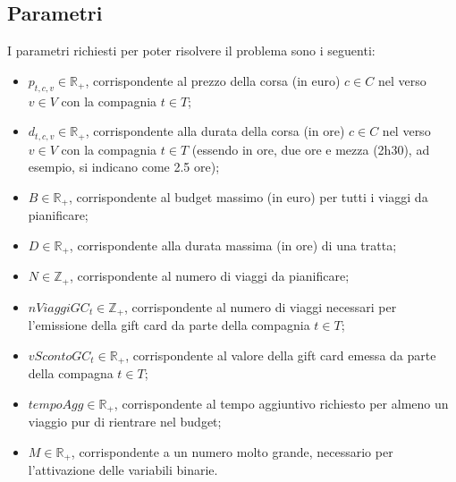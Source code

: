 \documentclass[main.tex]{subfiles}
\begin{document}
\subsection*{Parametri}
I parametri richiesti per poter risolvere il problema sono i seguenti:
\begin{itemize}
    \item $p_{t,c,v} \in \mathbb{R}_+$, corrispondente al prezzo della corsa (in euro) $c \in C$ nel verso $v \in V$ con la compagnia $t \in T$;
    \item $d_{t,c,v} \in \mathbb{R}_+$, corrispondente alla durata della corsa (in ore) $c \in C$ nel verso $v \in V$ con la compagnia $t \in T$ (essendo in ore, due ore e mezza (2h30), ad esempio, si indicano come 2.5 ore);
    \item $B \in \mathbb{R}_+$, corrispondente al budget massimo (in euro) per tutti i viaggi da pianificare;
    \item $D \in \mathbb{R}_+$, corrispondente alla durata massima (in ore) di una tratta;
    \item $N \in \mathbb{Z}_+$, corrispondente al numero di viaggi da pianificare;
    \item $nViaggiGC_t \in \mathbb{Z}_+$, corrispondente al numero di viaggi necessari per l'emissione della gift card da parte della compagnia $t \in T$;
    \item $vScontoGC_t \in \mathbb{R}_+$, corrispondente al valore della gift card emessa da parte della compagna $t \in T$;
    \item $tempoAgg \in \mathbb{R}_+$, corrispondente al tempo aggiuntivo richiesto per almeno un viaggio pur di rientrare nel budget;
    \item $M \in \mathbb{R}_+$, corrispondente a un numero molto grande, necessario per l'attivazione delle variabili binarie.
\end{itemize}
\end{document}
